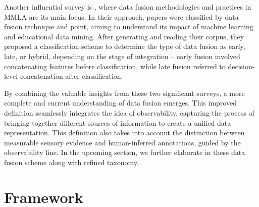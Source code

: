 \documentclass[manuscript,screen,review]{acmart}
\begin{document}
Another influential survey is \citet{chango_review_nodate}, where data fusion methodologies and practices in MMLA are its main focus. In their approach, papers were classified by data fusion technique and point, aiming to understand its impact of machine learning and educational data mining. After generating and reading their corpus, they proposed a classification scheme to determine the type of data fusion as early, late, or hybrid, depending on the stage of integration – early fusion involved concatenating features before classification, while late fusion referred to decision-level concatenation after classification. 

By combining the valuable insights from these two significant surveys, a more complete and current understanding of data fusion emerges. This improved definition seamlessly integrates the idea of observability, capturing the process of bringing together different sources of information to create a unified data representation. This definition also takes into account the distinction between measurable sensory evidence and human-inferred annotations, guided by the observability line. In the upcoming section, we further elaborate in these data fusion scheme along with refined taxonomy.

\section{Framework} 
\end{document}
